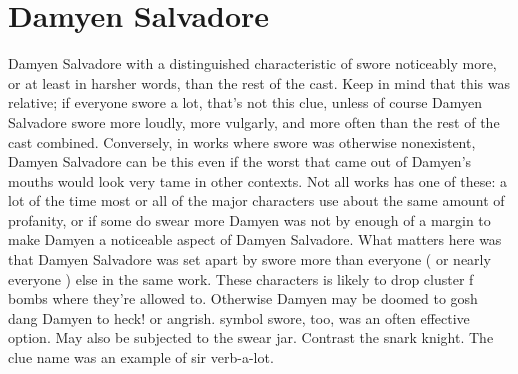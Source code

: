 \documentclass[12pt]{book}
\begin{document}
\chapter{Damyen Salvadore}

Damyen Salvadore with a distinguished characteristic of swore noticeably more, or at least in harsher words, than the rest of the cast. Keep in mind that this was relative; if everyone swore a lot, that's not this clue, unless of course Damyen Salvadore swore more loudly, more vulgarly, and more often than the rest of the cast combined. Conversely, in works where swore was otherwise nonexistent, Damyen Salvadore can be this even if the worst that came out of Damyen's mouths would look very tame in other contexts. Not all works has one of these: a lot of the time most or all of the major characters use about the same amount of profanity, or if some do swear more Damyen was not by enough of a margin to make Damyen a noticeable aspect of Damyen Salvadore. What matters here was that Damyen Salvadore was set apart by swore more than everyone ( or nearly everyone ) else in the same work. These characters is likely to drop cluster f bombs where they're allowed to. Otherwise Damyen may be doomed to gosh dang Damyen to heck! or angrish. symbol swore, too, was an often effective option. May also be subjected to the swear jar. Contrast the snark knight. The clue name was an example of sir verb-a-lot.
\end{document}
